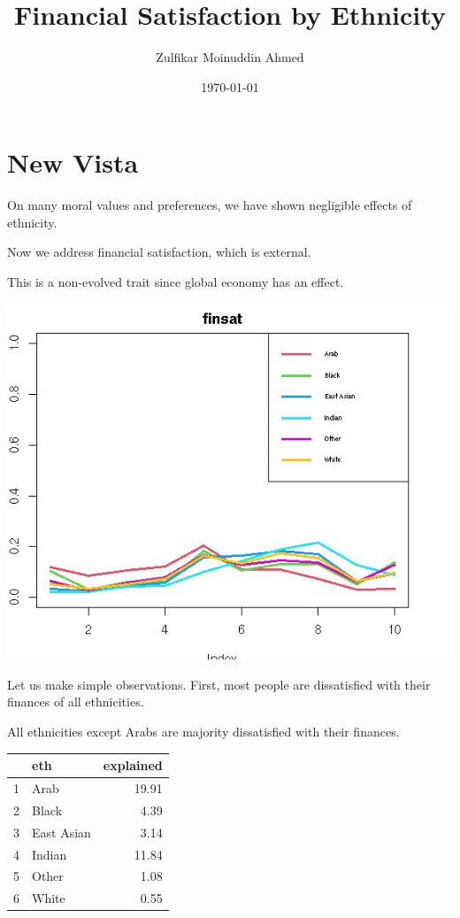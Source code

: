 \documentclass{amsart}
\title{Financial Satisfaction by Ethnicity}
\author{Zulfikar Moinuddin Ahmed}
\date{\today}
\begin{document}
\maketitle

\section{New Vista}

On many moral values and preferences, we have shown negligible effects of ethnicity.

Now we address financial satisfaction, which is external.

This is a non-evolved trait since global economy has an effect.

\includegraphics[scale=0.8]{finsat.jpeg}

Let us make simple observations.  First, most people are dissatisfied with their finances of all ethnicities.

All ethnicities except Arabs are majority dissatisfied with their finances.




\begin{table}[ht]
\centering
\begin{tabular}{rlr}
  \hline
 & eth & explained \\ 
  \hline
1 & Arab & 19.91 \\ 
  2 & Black & 4.39 \\ 
  3 & East Asian & 3.14 \\ 
  4 & Indian & 11.84 \\ 
  5 & Other & 1.08 \\ 
  6 & White & 0.55 \\ 
   \hline
\end{tabular}
\end{table}
\end{document}
